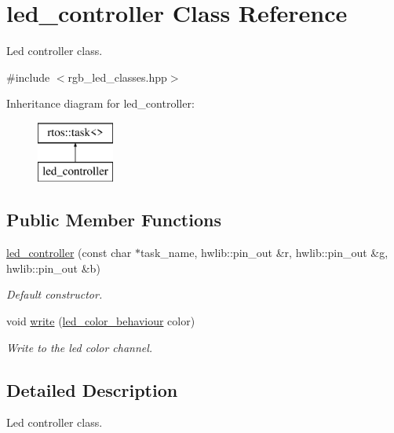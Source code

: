 \hypertarget{classled__controller}{}\section{led\+\_\+controller Class Reference}
\label{classled__controller}


Led controller class.  




{\ttfamily \#include $<$rgb\+\_\+led\+\_\+classes.\+hpp$>$}

Inheritance diagram for led\+\_\+controller\+:\begin{figure}[H]
\begin{center}
\leavevmode
\includegraphics[height=2.000000cm]{classled__controller}
\end{center}
\end{figure}
\subsection*{Public Member Functions}
\begin{DoxyCompactItemize}
\item 
\hyperlink{classled__controller_a1ace48b14131910317e79e64df4306f5}{led\+\_\+controller} (const char $\ast$task\+\_\+name, hwlib\+::pin\+\_\+out \&r, hwlib\+::pin\+\_\+out \&g, hwlib\+::pin\+\_\+out \&b)
\begin{DoxyCompactList}\small\item\em Default constructor. \end{DoxyCompactList}\item 
void \hyperlink{classled__controller_a346241076add950fe9c929d22039e171}{write} (\hyperlink{structled__color__behaviour}{led\+\_\+color\+\_\+behaviour} color)
\begin{DoxyCompactList}\small\item\em Write to the led color channel. \end{DoxyCompactList}\end{DoxyCompactItemize}


\subsection{Detailed Description}
Led controller class. 

